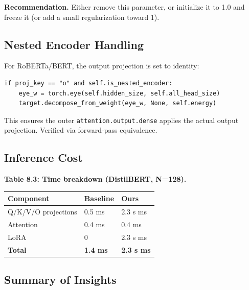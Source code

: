 \textbf{Recommendation.} Either remove this parameter, or initialize it to 
1.0 and freeze it (or add a small regularization toward 1).

\subsection{Nested Encoder Handling}

For RoBERTa/BERT, the output projection is set to identity:

\begin{lstlisting}
if proj_key == "o" and self.is_nested_encoder:
    eye_w = torch.eye(self.hidden_size, self.all_head_size)
    target.decompose_from_weight(eye_w, None, self.energy)
\end{lstlisting}

This ensures the outer \texttt{attention.output.dense} applies the actual 
output projection. Verified via forward-pass equivalence.

\subsection{Inference Cost}

\textbf{Table 8.3: Time breakdown (DistilBERT, N=128).}

\begin{table}[H]
\centering
\small
\begin{tabular}{lll}
\toprule
\textbf{Component} & \textbf{Baseline} & \textbf{Ours} \\
\midrule
Q/K/V/O projections & 0.5 ms & 2.3 s ms \\
Attention & 0.4 ms & 0.4 ms \\
LoRA & 0 & 2.3 s ms \\
\textbf{Total} & \textbf{1.4 ms} & \textbf{2.3 s ms} \\
\bottomrule
\end{tabular}
\end{table}

\subsection{Summary of Insights}

